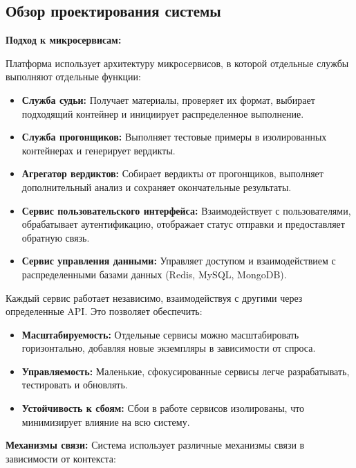 \subsection{Обзор проектирования системы}

\textbf{Подход к микросервисам:}
\noindent

Платформа использует архитектуру микросервисов, в которой отдельные службы выполняют отдельные функции:
\noindent
\begin{itemize}
    \itemsep 0em
    \item \textbf{Служба судьи:} \noindent Получает материалы, проверяет их формат, выбирает подходящий контейнер и инициирует распределенное выполнение.
    \item \textbf{Служба прогонщиков:} \noindent Выполняет тестовые примеры в изолированных контейнерах и генерирует вердикты.
    \item \textbf{Агрегатор вердиктов:} \noindent Собирает вердикты от прогонщиков, выполняет дополнительный анализ и сохраняет окончательные результаты.
    \item \textbf{Сервис пользовательского интерфейса:} \noindent Взаимодействует с пользователями, обрабатывает аутентификацию, отображает статус отправки и предоставляет обратную связь.
    \item \textbf{Сервис управления данными:} \noindent Управляет доступом и взаимодействием с распределенными базами данных (Redis, MySQL, MongoDB).
\end{itemize}

\noindent
Каждый сервис работает независимо, взаимодействуя с другими через определенные API. Это позволяет обеспечить:

\begin{itemize}
    \itemsep 0em
    \item \textbf{Масштабируемость:} \noindent Отдельные сервисы можно масштабировать горизонтально, добавляя новые экземпляры в зависимости от спроса.
    \item \textbf{Управляемость:} \noindent Маленькие, сфокусированные сервисы легче разрабатывать, тестировать и обновлять.
    \item \textbf{Устойчивость к сбоям:} \noindent Сбои в работе сервисов изолированы, что минимизирует влияние на всю систему.
\end{itemize}

\noindent
\textbf{Механизмы связи:} \noindent Система использует различные механизмы связи в зависимости от контекста:

